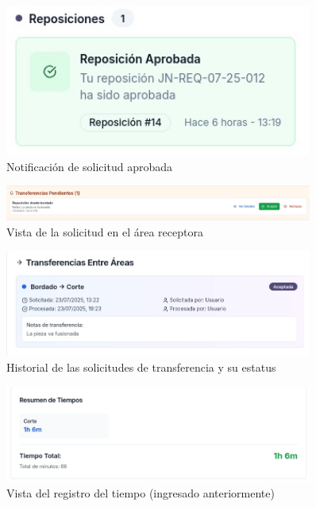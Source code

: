 \documentclass[12pt,letterpaper,spanish]{report}
\begin{document}
 \begin{figure}
   \centering
   \includegraphics[width=0.9\textwidth]{notiaprov.jpg}
   \caption{Notificación de solicitud aprobada}\label{notiaprov}
 \end{figure}

 \begin{figure}
   \centering
   \includegraphics[width=0.9\textwidth]{vistarecep.jpg}
   \caption{Vista de la solicitud en el área receptora}\label{vistarecep}
 \end{figure}

 \begin{figure}
   \centering
   \includegraphics[width=0.9\textwidth]{historial.jpg}
   \caption{Historial de las solicitudes de transferencia y su estatus}\label{historial}
 \end{figure}

 \begin{figure}
   \centering
   \includegraphics[width=0.9\textwidth]{tiempo.jpg}
   \caption{Vista del registro del tiempo (ingresado anteriormente)}\label{tiempo}
   \end{figure}
   
\end{document}
